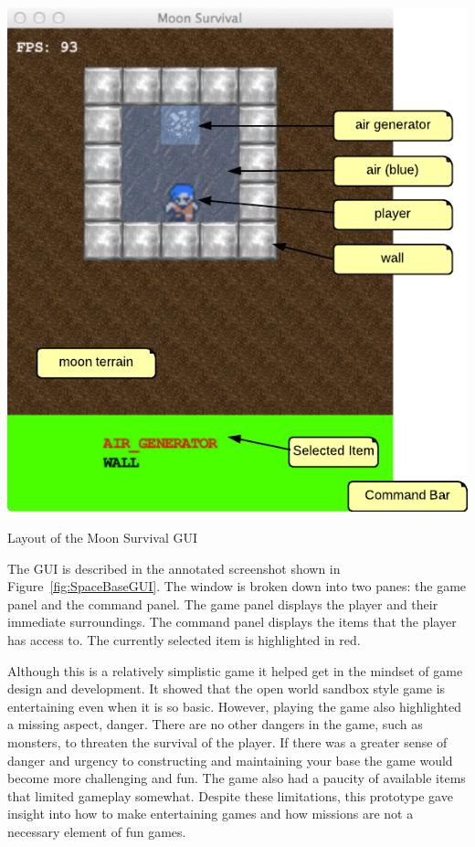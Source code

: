 \begin{marginfigure}
	\includegraphics{res/space_base_prototype/MoonSurvivalGUI.pdf}
	\caption{Layout of the Moon Survival GUI}
	\label{fig:SpaceBaseGUI}
\end{marginfigure}

The GUI is described in the annotated screenshot shown in Figure~\ref{fig:SpaceBaseGUI}. The window is broken down into two panes: the game panel and the command panel. The game panel displays the player and their immediate surroundings. The command panel displays the items that the player has access to. The currently selected item is highlighted in red.

Although this is a relatively simplistic game it helped get in the mindset of game design and development. It showed that the open world sandbox style game is entertaining even when it is so basic. However, playing the game also highlighted a missing aspect, danger. There are no other dangers in the game, such as monsters, to threaten the survival of the player. If there was a greater sense of danger and urgency to constructing and maintaining your base the game would become more challenging and fun. The game also had a paucity of available items that limited gameplay somewhat. Despite these limitations, this prototype gave insight into how to make entertaining games and how missions are not a necessary element of fun games. 
